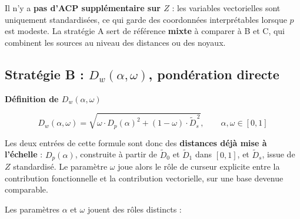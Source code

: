 \documentclass[11pt, a4paper]{article}
\newcommand{\Dp}{D_p}
\newcommand{\Dw}{D_w}
\newenvironment{keybox}[1][]{%
  \def\FrameCommand{\fboxsep=8pt \fcolorbox{emphborder}{emphbox}}%
  \MakeFramed{\advance\hsize-\width \FrameRestore}%
  \noindent\textbf{#1}\par\smallskip\noindent\ignorespaces
}{\endMakeFramed}
\begin{document}
Il n'y a \textbf{pas d'ACP supplémentaire sur $Z$} : les variables
vectorielles sont uniquement standardisées, ce qui garde des coordonnées
interprétables lorsque $p$ est modeste. La stratégie A sert de référence
\textbf{mixte} à comparer à B et C, qui combinent les sources au niveau des
distances ou des noyaux.

\subsection{Stratégie B : $\Dw(\alpha, \omega)$, pondération directe}

\begin{keybox}[Définition de $\Dw(\alpha, \omega)$]
\[
  \Dw(\alpha, \omega) = \sqrt{\omega \cdot \Dp(\alpha)^2
  + (1 - \omega) \cdot \tilde{D}_s^{\,2}},
  \qquad \alpha, \omega \in [0, 1]
\]
\end{keybox}

Les deux entrées de cette formule sont donc des \textbf{distances déjà
mise à l'échelle} : $\Dp(\alpha)$, construite à partir de $\tilde{D}_0$
et $\tilde{D}_1$ dans $[0,1]$, et $\tilde{D}_s$, issue de $Z$
standardisé. Le paramètre $\omega$ joue alors le rôle de curseur
explicite entre la contribution fonctionnelle et la contribution
vectorielle, sur une base devenue comparable.

Les paramètres $\alpha$ et $\omega$ jouent des rôles distincts :

\begin{figure}[H]
\centering
{}
\end{figure}
\end{document}
